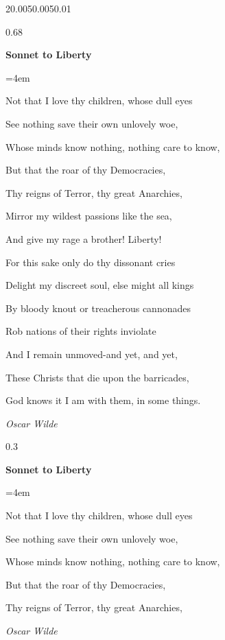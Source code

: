 \documentclass{sn-jnl}
\theoremstyle{thmstyleone}%
\theoremstyle{thmstyletwo}%
\theoremstyle{thmstylethree}%
\numberwithin{equation}{section}
\newenvironment{poem}{\setlength{\parindent}{0em}}{}
\newcommand{\poemTitle}[1]{\begin{center}\large\textbf{#1}\end{center}}
\newenvironment{stanza}{\vspace{0.25 em}\hangindent=4em}{\vspace{1 em}}
\newcommand{\poemauthorleft}[1]{\vspace{-1em}\begin{flushleft}\textit{#1}\end{flushleft}}
\newcommand{\poemlineleft}[1]{{\raggedright{#1}\par}\vspace{-\parskip}}
\begin{document}
\begin{sidebyside}{2}{0.005}{0.005}{0.01}%
\begin{sbspanel}{0.68}%
\begin{poem}%
\poemTitle{Sonnet to Liberty}
%
\begin{stanza}
\poemlineleft{Not that I love thy children, whose dull eyes}
\poemlineleft{See nothing save their own unlovely woe,}
\poemlineleft{Whose minds know nothing, nothing care to know,}
\poemlineleft{But that the roar of thy Democracies,}
\poemlineleft{Thy reigns of Terror, thy great Anarchies,}
\poemlineleft{Mirror my wildest passions like the sea,}
\poemlineleft{And give my rage a brother! Liberty!}
\poemlineleft{For this sake only do thy dissonant cries}
\poemlineleft{Delight my discreet soul, else might all kings}
\poemlineleft{By bloody knout or treacherous cannonades}
\poemlineleft{Rob nations of their rights inviolate}
\poemlineleft{And I remain unmoved-and yet, and yet,}
\poemlineleft{These Christs that die upon the barricades,}
\poemlineleft{God knows it I am with them, in some things.}
\end{stanza}
\poemauthorleft{Oscar Wilde}
\end{poem}
\end{sbspanel}%
\begin{sbspanel}{0.3}%
\begin{poem}%
\poemTitle{Sonnet to Liberty}
\begin{stanza}
\poemlineleft{Not that I love thy children, whose dull eyes}
\poemlineleft{See nothing save their own unlovely woe,}
\poemlineleft{Whose minds know nothing, nothing care to know,}
\poemlineleft{But that the roar of thy Democracies,}
\poemlineleft{Thy reigns of Terror, thy great Anarchies,}
\poemlineleft{\textellipsis{}}
\end{stanza}
\poemauthorleft{Oscar Wilde}
\end{poem}
\end{sbspanel}%
\end{sidebyside}%
%
%
\typeout{************************************************}
\typeout{************************************************}
%
\end{document}
